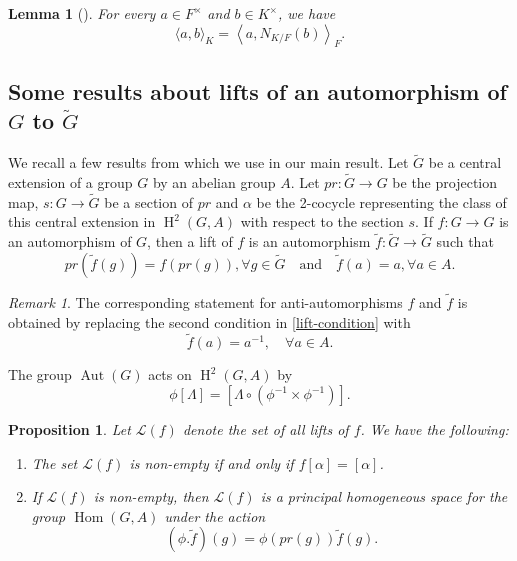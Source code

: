 \documentclass[11pt, a4paper, reqno]{amsart}
\newtheorem{lemma}[theorem]{Lemma}
\newtheorem{proposition}[theorem]{Proposition}
\theoremstyle{definition}
\theoremstyle{remark}
\newtheorem{remark}[theorem]{Remark}
\theoremstyle{example}
\theoremstyle{note}
\numberwithin{equation}{section}
\DeclareMathOperator{\Hom}{Hom}
\DeclareMathOperator{\Aut}{Aut}
\DeclareMathOperator{\coh}{H}
\begin{document}
\begin{lemma}[{\cite[p.~48]{KazPat[2]}}]
\label{relation between Hilbert symbol on K and F}
For every $a\in F^\times$ and $b\in K^\times$, we have
\begin{equation*}
\langle a,b\rangle_{K}
    =
    \left\langle a,N_{K/F}(b)\right\rangle_{F}.
\end{equation*}
\end{lemma}








\subsection{Some results about lifts of an automorphism of $G$ to $\widetilde{G}$}\label{results we need}

We recall a few results from \cite{Kab} which we use in our main result. Let $\widetilde{G}$ be a central extension of a group $G$ by an abelian group $A$. Let $pr: \widetilde{G}\rightarrow G$ be the projection map, $s: G\rightarrow \widetilde{G}$ be a section of $pr$ and $\alpha$ be the 2-cocycle representing the class of this central extension in $\coh^{2}(G,A)$ with respect to the section $s$. If $f: G\rightarrow G$ is an automorphism  of $G$, then a lift of $f$ is an automorphism  $\tilde{f}: \widetilde{G}\rightarrow \widetilde{G}$ such that 
\begin{equation}\label{lift-condition}
    pr(\tilde{f}(g))=f(pr(g)), \forall g\in \widetilde{G} \quad \text{and} \quad \tilde{f}(a) = a, \forall a\in A.
\end{equation}

\begin{remark}
  The corresponding statement for anti-automorphisms $f$ and $\tilde{f}$ is obtained by replacing the second condition in \eqref{lift-condition} with  $$ \tilde{f}(a) = a^{-1}, \quad \forall a \in A. $$ %
\end{remark} 
The group $\Aut(G)$ acts on $\coh ^{2}(G,A)$ by $$ \phi [\Lambda]= [\Lambda \circ (\phi^{-1}\times \phi^{-1})].$$ 



\begin{proposition}\label{description of the set of liftings} Let $\mathcal{L}(f)$ denote the set of all lifts of $f$. We have the following: %
\begin{enumerate}
\item[\emph{1)}] The set $\mathcal{L}(f)$ is non-empty if and only if $f [\alpha]=[\alpha]$.
\smallskip
\item[\emph{2)}] If $\mathcal{L}(f)$ is non-empty, then $\mathcal{L}(f)$ is a principal homogeneous space for the group $\Hom(G,A)$ under the action
\[(\phi.\tilde{f})(g)= \phi(pr(g))\tilde{f}(g).\]
\end{enumerate}
\end{proposition}
\end{document}

